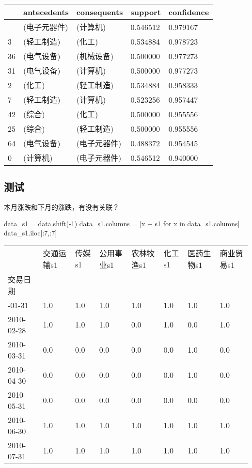 \documentclass[
  letterpaper,
  DIV=11,
  numbers=noendperiod]{scrreprt}
\newenvironment{Shaded}{\begin{snugshade}}{\end{snugshade}}
\newcommand{\ControlFlowTok}[1]{\textcolor[rgb]{0.00,0.23,0.31}{#1}}
\newcommand{\DecValTok}[1]{\textcolor[rgb]{0.68,0.00,0.00}{#1}}
\newcommand{\KeywordTok}[1]{\textcolor[rgb]{0.00,0.23,0.31}{#1}}
\newcommand{\NormalTok}[1]{\textcolor[rgb]{0.00,0.23,0.31}{#1}}
\newcommand{\OperatorTok}[1]{\textcolor[rgb]{0.37,0.37,0.37}{#1}}
\newcommand{\StringTok}[1]{\textcolor[rgb]{0.13,0.47,0.30}{#1}}
\begin{document}
\begin{longtable}[]{@{}lllll@{}}
\toprule\noalign{}
& antecedents & consequents & support & confidence \\
\midrule\noalign{}
\endhead
\bottomrule\noalign{}
\endlastfoot
1 & (电子元器件) & (计算机) & 0.546512 & 0.979167 \\
3 & (轻工制造) & (化工) & 0.534884 & 0.978723 \\
36 & (电气设备) & (机械设备) & 0.500000 & 0.977273 \\
31 & (电气设备) & (计算机) & 0.500000 & 0.977273 \\
2 & (化工) & (轻工制造) & 0.534884 & 0.958333 \\
7 & (轻工制造) & (计算机) & 0.523256 & 0.957447 \\
42 & (综合) & (化工) & 0.500000 & 0.955556 \\
25 & (综合) & (轻工制造) & 0.500000 & 0.955556 \\
64 & (电气设备) & (电子元器件) & 0.488372 & 0.954545 \\
0 & (计算机) & (电子元器件) & 0.546512 & 0.940000 \\
\end{longtable}

\hypertarget{ux6d4bux8bd5-1}{%
\subsection{测试}\label{ux6d4bux8bd5-1}}

本月涨跌和下月的涨跌，有没有关联？

\begin{Shaded}
\begin{Highlighting}[]
\NormalTok{data\_s1 }\OperatorTok{=}\NormalTok{ data.shift(}\OperatorTok{{-}}\DecValTok{1}\NormalTok{)}
\NormalTok{data\_s1.columns }\OperatorTok{=}\NormalTok{ [x }\OperatorTok{+} \StringTok{\textquotesingle{}s1\textquotesingle{}} \ControlFlowTok{for}\NormalTok{ x }\KeywordTok{in}\NormalTok{ data\_s1.columns]}
\NormalTok{data\_s1.iloc[:}\DecValTok{7}\NormalTok{,:}\DecValTok{7}\NormalTok{]}
\end{Highlighting}
\end{Shaded}

\begin{longtable}[]{@{}llllllll@{}}
\toprule\noalign{}
& 交通运输s1 & 传媒s1 & 公用事业s1 & 农林牧渔s1 & 化工s1 & 医药生物s1 &
商业贸易s1 \\
交易日期 & & & & & & & \\
\midrule\noalign{}
\endhead
\bottomrule\noalign{}
\endlastfoot
2010-01-31 & 1.0 & 1.0 & 1.0 & 1.0 & 1.0 & 1.0 & 1.0 \\
2010-02-28 & 1.0 & 1.0 & 1.0 & 0.0 & 1.0 & 0.0 & 1.0 \\
2010-03-31 & 0.0 & 0.0 & 0.0 & 0.0 & 0.0 & 1.0 & 0.0 \\
2010-04-30 & 0.0 & 0.0 & 0.0 & 0.0 & 0.0 & 1.0 & 0.0 \\
2010-05-31 & 0.0 & 0.0 & 0.0 & 0.0 & 0.0 & 0.0 & 0.0 \\
2010-06-30 & 1.0 & 1.0 & 1.0 & 1.0 & 1.0 & 1.0 & 1.0 \\
2010-07-31 & 1.0 & 1.0 & 1.0 & 1.0 & 1.0 & 1.0 & 1.0 \\
\end{longtable}
\end{document}
